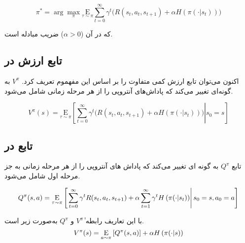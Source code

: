        \begin{equation}
        \pi^* = \arg \max_{\pi} \underset{\tau \sim \pi}{\mathrm E}{ \sum_{t=0}^{\infty} \gamma^t \bigg( R(s_t, a_t, s_{t+1}) + \alpha H\left(\pi(\cdot|s_t)\right) \bigg)}
       \end{equation}
       
       
       
       که در آن
        (\(\alpha > 0\))
         ضریب مبادله
          است.
          \subsection{تابع ارزش در }
           اکنون می‌توان تابع ارزش کمی متفاوت را بر اساس این مفهموم تعریف کرد.
            \(V^{\pi}\)
             به گونه‌ای تغییر می‌کند که پاداش‌های آنتروپی را از هر مرحله زمانی شامل می‌شود.
             
             \begin{equation}
             	V^{\pi}(s) = \underset{\tau \sim \pi}{\mathrm E}{ \left. \left[ \sum_{t=0}^{\infty} \gamma^t \bigg( R(s_t, a_t, s_{t+1}) + \alpha H\left(\pi(\cdot|s_t)\right) \bigg) \right| s_0 = s\right] }
             \end{equation}
             
             
            \subsection{تابع 
            در }
            تابع
            \(Q^{\pi}\)
             به گونه ای تغییر می‌کند که پاداش های آنتروپی را از هر مرحله زمانی به جز مرحله اول شامل می‌شود.
             
             \begin{equation}
             	Q^{\pi}(s,a) = \underset{\tau \sim \pi}{\mathrm{E}}\left[
             { \left. \sum_{t=0}^{\infty} \gamma^t  R(s_t, a_t, s_{t+1}) + \alpha \sum_{t=1}^{\infty} \gamma^t H\left(\pi(\cdot|s_t)\right)\right| s_0 = s, a_0 = a}
             \right]
             \end{equation}
             
       با این تعاریف رابطه
       ٰ\(V^{\pi}\)
       و 
       \(Q^{\pi}\)
        به‌صورت زیر است.
        \begin{equation}
         V^{\pi}(s) = \underset{a \sim \pi}{\mathrm{E}}\left[
         {Q^{\pi}(s,a)} 
         \right]+ \alpha H\left(\pi(\cdot|s)\right)
        \end{equation}
        
